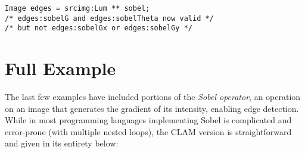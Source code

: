 \begin{lstlisting}[language=CLAM,escapechar=\%]
Image edges = srcimg:Lum ** sobel;
/* edges:sobelG and edges:sobelTheta now valid */
/* but not edges:sobelGx or edges:sobelGy */
\end{lstlisting}

\section{Full Example}

The last few examples have included portions of the \emph{Sobel operator}, an operation on an image
that generates the gradient of its intensity, enabling edge detection. 
While in most programming languages implementing Sobel
is complicated and error-prone (with multiple nested loops), the CLAM version is straightforward and
given in its entirety below:\\

 \clearpage


